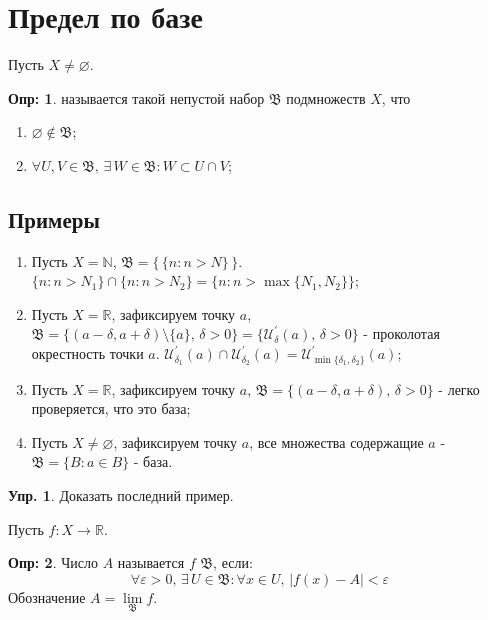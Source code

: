 \documentclass[12pt]{article}
\theoremstyle{definition}
\newtheorem{defn}{Опр:}
\newtheorem{exrc}{Упр.}
\begin{document}
\section*{Предел по базе}
Пусть $X \neq \varnothing$.

\begin{defn}
	 называется такой непустой набор $\mathfrak{B}$ подмножеств $X$, что 
	\begin{enumerate}[label={(\arabic*)}]
		\item $\varnothing \notin \mathfrak{B}$;
		\item $\forall U, V \in \mathfrak{B}, \, \exists \, W \in \mathfrak{B} \colon W \subset U \cap V$;
	\end{enumerate}
\end{defn}

\subsection*{Примеры}
\begin{enumerate}[label={\arabic*)}]
	\item Пусть $X = \mathbb{N}$, $\mathfrak{B} = \{\,\{n \colon n >N \} \,\}$. $\{n \colon n >N_1 \} \cap \{n \colon n >N_2 \} = \{n \colon n > \max{\{N_1, N_2 \}} \}$;
	
	\item Пусть $X = \mathbb{R}$, зафиксируем точку $a$, $\mathfrak{B} = \{(a - \delta, a + \delta)\setminus \{a\}, \, \delta >0  \} = \{ \mathcal{U}_\delta^\prime(a), \, \delta > 0 \}$ - проколотая окрестность точки $a$. $\mathcal{U}_{\delta_1}^\prime(a) \cap \mathcal{U}_{\delta_2}^\prime(a) = \mathcal{U}_{\min\{\delta_1, \delta_2\} }^\prime(a)$;
	
	\item Пусть $X = \mathbb{R}$, зафиксируем точку $a$, $\mathfrak{B} = \{(a - \delta, a + \delta), \, \delta >0 \}$ - легко проверяется, что это база;
	
	\item Пусть $X \neq \varnothing$, зафиксируем точку $a$, все множества содержащие $a$ - $\mathfrak{B} = \{B \colon a \in B \}$ - база.
\end{enumerate}

\begin{exrc}
	Доказать последний пример.
\end{exrc}
\newpage
Пусть $f \colon X \to \mathbb{R}$.

\begin{defn}
	Число $A$ называется  $f$  $\mathfrak{B}$, если: 
	$$
		\forall \varepsilon > 0, \, \exists \, U \in \mathfrak{B} \colon \forall x \in U, \, |f(x) - A| < \varepsilon
	$$ 
	Обозначение $A = \lim\limits_{\mathfrak{B}}f$.
\end{defn}
\end{document}
